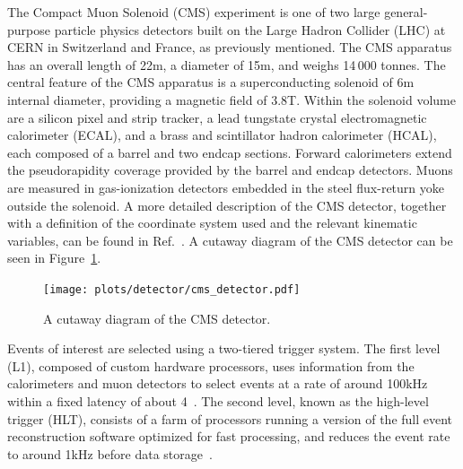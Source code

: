 The Compact Muon Solenoid (CMS) experiment is one of two large general-purpose particle physics detectors built on the Large Hadron Collider (LHC) at CERN in Switzerland and France, as previously mentioned. The CMS apparatus has an overall length of 22\unit{m}, a diameter of 15\unit{m}, and weighs 14\,000 \unit{tonnes}. The central feature of the CMS apparatus is a superconducting solenoid of 6\unit{m} internal diameter, providing a magnetic field of 3.8\unit{T}. Within the solenoid volume are a silicon pixel and strip tracker, a lead tungstate crystal electromagnetic calorimeter (ECAL), and a brass and scintillator hadron calorimeter (HCAL), each composed of a barrel and two endcap sections. Forward calorimeters extend the pseudorapidity coverage provided by the barrel and endcap detectors. Muons are measured in gas-ionization detectors embedded in the steel flux-return yoke outside the solenoid. A more detailed description of the CMS detector, together with a definition of the coordinate system used and the relevant kinematic variables, can be found in Ref.~\cite{CMS:2008xjf}. A cutaway diagram of the CMS detector can be seen in Figure~\ref{fig:cms-detector}.

\begin{figure}[!htb]
\centering
\texttt{[image: plots/detector/cms\_detector.pdf]}  \\
\caption[A cutaway diagram of the CMS detector]{A cutaway diagram of the CMS detector.}
\label{fig:cms-detector}
\end{figure}

Events of interest are selected using a two-tiered trigger system. The first level (L1), composed of custom hardware processors, uses information from the calorimeters and muon detectors to select events at a rate of around 100\unit{kHz} within a fixed latency of about 4\mus~\cite{CMS:2020cmk}. The second level, known as the high-level trigger (HLT), consists of a farm of processors running a version of the full event reconstruction software optimized for fast processing, and reduces the event rate to around 1\unit{kHz} before data storage~\cite{CMS:2016ngn}.

